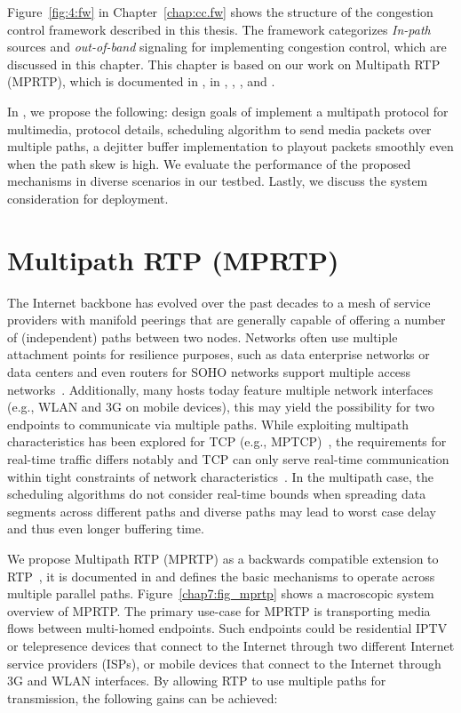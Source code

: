Figure~\ref{fig:4:fw} in Chapter~\ref{chap:cc.fw} shows the structure of the
congestion control framework described in this thesis. The framework
categorizes \emph{In-path} sources and \emph{out-of-band} signaling for
implementing congestion control, which are discussed in this chapter. This
chapter is based on our work on Multipath RTP (MPRTP), which is documented in
, in \cite{draft.mprtp}, \cite{draft.mprtp.sdp},
\cite{Globisch:AsymGrpComm}, and \cite{draft.rtcp.overlay}.

In , we propose the following: design goals of implement a
multipath protocol for multimedia, protocol details, scheduling algorithm to
send media packets over multiple paths, a dejitter buffer implementation to
playout packets smoothly even when the path skew is high. We evaluate the
performance of the proposed mechanisms in diverse scenarios in our testbed.
Lastly, we discuss the system consideration for deployment.

\section{Multipath RTP (MPRTP)}

The Internet backbone has evolved over the past decades to a mesh of service
providers with manifold peerings that are generally capable of offering a
number of (independent) paths between two nodes. Networks often use multiple
attachment points for resilience purposes, such as data enterprise networks or
data centers and even routers for SOHO networks support multiple access
networks~\cite{draft.fun.multi, draft.homenet.arch}. Additionally, many hosts
today feature multiple network interfaces (e.g., WLAN and 3G on mobile
devices), this may yield the possibility for two endpoints to communicate via
multiple paths. While exploiting multipath characteristics
\cite{Wischik:2008:RPP} has been explored for TCP (e.g.,
MPTCP)~\cite{rfc6824}, the requirements for real-time traffic differs notably
and TCP can only serve real-time communication within tight constraints of
network characteristics~\cite{Brosh:tcp-real-time}. In the multipath case, the
scheduling algorithms do not consider real-time bounds when spreading data
segments across different paths and diverse paths may lead to worst case delay
and thus even longer buffering time.


We propose Multipath RTP (MPRTP) as a backwards compatible extension to
RTP~\cite{rfc3550}, it is documented in \cite{draft.mprtp} and defines the
basic mechanisms to operate across multiple parallel paths.
Figure~\ref{chap7:fig_mprtp} shows a macroscopic system overview of MPRTP. The
primary use-case for MPRTP is transporting media flows between multi-homed
endpoints. Such endpoints could be residential IPTV or telepresence devices
that connect to the Internet through two different Internet service providers
(ISPs), or mobile devices that connect to the Internet through 3G and WLAN
interfaces. By allowing RTP to use multiple paths for transmission, the
following gains can be achieved:

